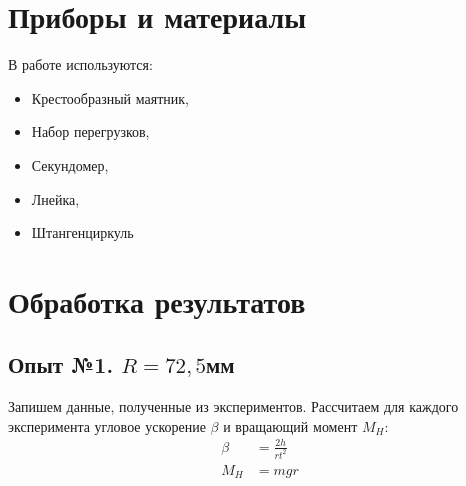 \documentclass[a4paper, 12pt]{article}
\begin{document}
\section{Приборы и материалы}

В работе используются:

\begin{itemize}
	\item Крестообразный маятник,
	\item Набор перегрузков,
	\item Секундомер,
	\item Лнейка,
	\item Штангенциркуль
\end{itemize}

\section{Обработка результатов}

\subsection{Опыт №1. $R = 72,5$мм}

Запишем данные, полученные из экспериментов.
Рассчитаем для каждого эксперимента угловое ускорение $\beta$ и вращающий момент $M_H$:
\begin{align*}
\beta &= \frac{2h}{rt^2} \\
M_H &= mgr
\end{align*}
\end{document}
